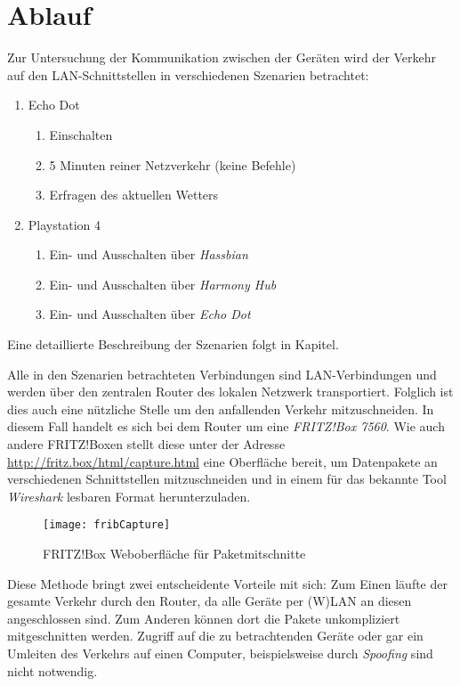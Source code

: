 \section{Ablauf}\label{sec:ablauf}
Zur Untersuchung der Kommunikation zwischen der Geräten wird der Verkehr auf den LAN-Schnittstellen in verschiedenen Szenarien betrachtet:

\begin{enumerate}
    \item Echo Dot
    \begin{enumerate}[label*=\arabic*.]
        \item Einschalten
        \item 5 Minuten reiner Netzverkehr (keine Befehle)
        \item Erfragen des aktuellen Wetters
    \end{enumerate}
    \item Playstation 4
    \begin{enumerate}[label*=\arabic*.]
        \item Ein- und Ausschalten über \textit{Hassbian}
        \item Ein- und Ausschalten über \textit{Harmony Hub}
        \item Ein- und Ausschalten über \textit{Echo Dot}
    \end{enumerate}
\end{enumerate}

Eine detaillierte Beschreibung der Szenarien folgt in Kapitel. 


Alle in den Szenarien betrachteten Verbindungen sind LAN-Verbindungen und werden über den zentralen Router des lokalen Netzwerk transportiert.
Folglich ist dies auch eine nützliche Stelle um den anfallenden Verkehr mitzuschneiden.
In diesem Fall handelt es sich bei dem Router um eine \textit{FRITZ!Box 7560}\cite{FRITZBox29:online}.
Wie auch andere FRITZ!Boxen stellt diese unter der Adresse \url{http://fritz.box/html/capture.html} eine Oberfläche bereit,
um Datenpakete an verschiedenen Schnittstellen mitzuschneiden
und in einem für das bekannte Tool \textit{Wireshark} lesbaren Format herunterzuladen.

\begin{figure}[ht!]
    \centering
    \texttt{[image: fribCapture]}
    \caption{FRITZ!Box Weboberfläche für Paketmitschnitte}\label{fig:fribCapture}
\end{figure}

Diese Methode bringt zwei entscheidente Vorteile mit sich:
Zum Einen läufte der gesamte Verkehr durch den Router, da alle Geräte per (W)LAN an diesen angeschlossen sind.
Zum Anderen können dort die Pakete unkompliziert mitgeschnitten werden. Zugriff auf die zu betrachtenden Geräte
oder gar ein Umleiten des Verkehrs auf einen Computer, beispielsweise durch \textit{Spoofing}\cite{Maninthe12:online} sind nicht notwendig.

